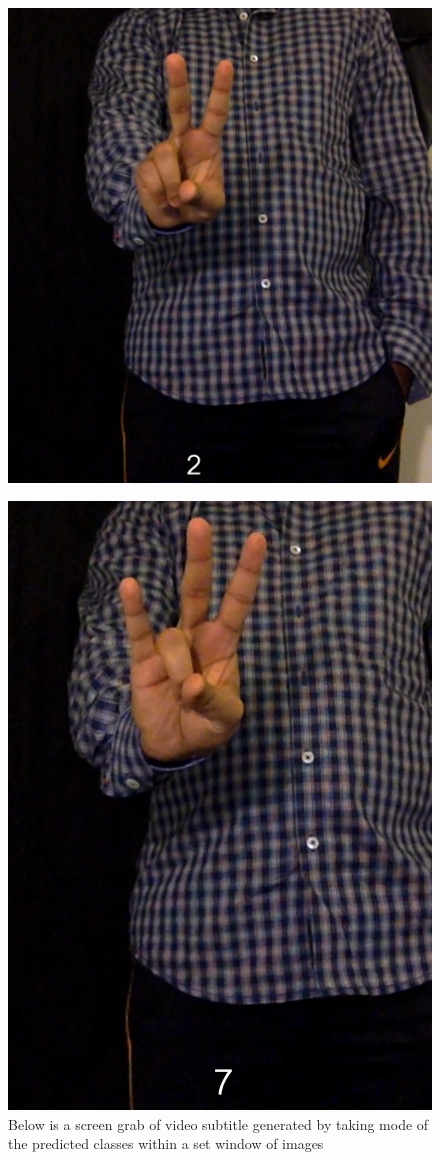\documentclass{acm} %
\begin{document}
\begin{figure}[h]
\centering
\includegraphics[width=1 in]{2}
\caption{}
\end{figure}


\begin{figure}[h]
\centering
\includegraphics[width=1 in]{7}
\caption{Below is a screen grab of video subtitle generated by taking mode of the predicted classes within a set window of images}
\label{fig:fig18}
\end{figure}



\end{document}
